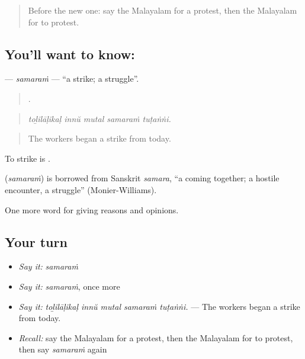 \label{lesson:ML-C425-samaram}



\begin{quote}
Before the new one: say the Malayalam for a protest, then the Malayalam for to protest.
\end{quote}

\subsection*{You'll want to know: }
\textbf{} — \emph{samaraṁ} — \textquotedblleft{}a strike; a struggle\textquotedblright{}.

\begin{quote}
    .
\end{quote}

\begin{quote}
\emph{toḻilāḷikaḷ innŭ mutal samaraṁ tuṭaṅṅi.}
\end{quote}

\begin{quote}
The workers began a strike from today.
\end{quote}

To strike is  .

\begin{cousinweb}
\textbf{} (\emph{samaraṁ}) is borrowed from Sanskrit \emph{samara}, \textquotedblleft{}a coming together; a hostile encounter, a struggle\textquotedblright{} (Monier-Williams).
\end{cousinweb}

\begin{grammarlens}[title={What you've built}]
One more word for giving reasons and opinions.
\end{grammarlens}

\subsection*{Your turn}
\begin{itemize}
\raggedright
  \item \emph{Say it:} \emph{samaraṁ}
  \item \emph{Say it:} \emph{samaraṁ}, once more
  \item \emph{Say it:} \emph{toḻilāḷikaḷ innŭ mutal samaraṁ tuṭaṅṅi.} — The workers began a strike from today.
  \item \emph{Recall:} say the Malayalam for a protest, then the Malayalam for to protest, then say \emph{samaraṁ} again
\end{itemize}

